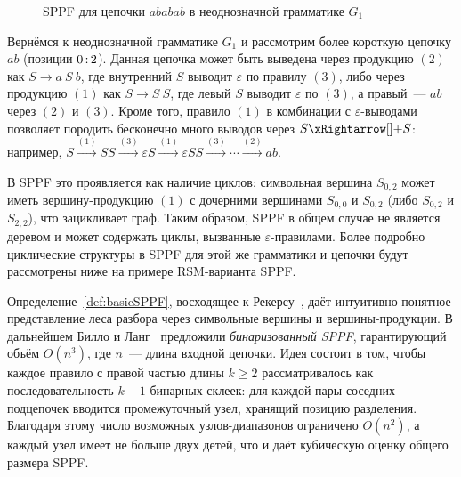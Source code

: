 \begin{example}
    \begin{figure}
        \begin{center}
            \resizebox{0.9\textwidth}{!}{}
        \end{center}
        \caption{SPPF для цепочки $ababab$ в неоднозначной грамматике $G_1$}
        \label{fig:sppf_ambiguous}
    \end{figure}
\end{example}

\begin{example}
    \label{exmpl:basic_sppf_cycles}
    Вернёмся к неоднозначной грамматике $G_1$ и рассмотрим более короткую цепочку $ab$ (позиции $0 \rng 2$).
    Данная цепочка может быть выведена через продукцию $(2)$ как $S \to a\ S\ b$, где внутренний $S$ выводит $\varepsilon$ по правилу $(3)$, либо через продукцию $(1)$ как $S \to S\ S$, где левый $S$ выводит $\varepsilon$ по $(3)$, а правый~--- $ab$ через $(2)$ и $(3)$.
    Кроме того, правило $(1)$ в комбинации с $\varepsilon$-выводами позволяет породить бесконечно много выводов через $S \derives[+] S$: например, $S \xrightarrow{(1)} S S \xrightarrow{(3)} \varepsilon S \xrightarrow{(1)} \varepsilon S S \xrightarrow{(3)} \cdots \xrightarrow{(2)} ab$.

    В SPPF это проявляется как наличие циклов: символьная вершина $S_{0,2}$ может иметь вершину-продукцию $(1)$ с дочерними вершинами $S_{0,0}$ и $S_{0,2}$ (либо $S_{0,2}$ и $S_{2,2}$), что зацикливает граф.
    Таким образом, SPPF в общем случае не является деревом и может содержать циклы, вызванные $\varepsilon$-правилами.
    Более подробно циклические структуры в SPPF для этой же грамматики и цепочки будут рассмотрены ниже на примере RSM-варианта SPPF.
\end{example}

Определение~\ref{def:basicSPPF}, восходящее к Рекерсу~, даёт интуитивно понятное представление леса разбора через символьные вершины и вершины-продукции.
В дальнейшем Билло и Ланг~ предложили \emph{бинаризованный SPPF}, гарантирующий объём $O(n^3)$, где $n$~--- длина входной цепочки.
Идея состоит в том, чтобы каждое правило с правой частью длины $k \geq 2$ рассматривалось как последовательность $k-1$ бинарных склеек: для каждой пары соседних подцепочек вводится промежуточный узел, хранящий позицию разделения.
Благодаря этому число возможных узлов-диапазонов ограничено $O(n^2)$, а каждый узел имеет не больше двух детей, что и даёт кубическую оценку общего размера SPPF.

